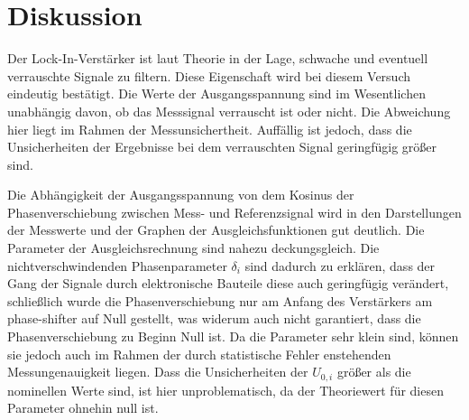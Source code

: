 \section{Diskussion}
\label{sec:Diskussion}
Der Lock-In-Verstärker ist laut Theorie in der Lage, schwache und eventuell
verrauschte Signale zu filtern. Diese Eigenschaft wird bei diesem Versuch eindeutig bestätigt.
Die Werte der Ausgangsspannung sind im Wesentlichen unabhängig davon, ob das Messsignal
verrauscht ist oder nicht. Die Abweichung hier liegt im Rahmen der Messunsichertheit.
Auffällig ist jedoch, dass die Unsicherheiten der Ergebnisse bei dem verrauschten
Signal geringfügig größer sind.

Die Abhängigkeit der Ausgangsspannung von dem Kosinus der Phasenverschiebung zwischen
Mess- und Referenzsignal wird in den Darstellungen der Messwerte und der Graphen
der Ausgleichsfunktionen gut deutlich. Die Parameter der Ausgleichsrechnung sind
nahezu deckungsgleich. Die nichtverschwindenden Phasenparameter $\delta_i$ sind
dadurch zu erklären, dass der Gang der Signale durch elektronische Bauteile diese
auch geringfügig verändert, schließlich wurde die Phasenverschiebung nur am
Anfang des Verstärkers am phase-shifter auf Null gestellt, was widerum auch nicht
garantiert, dass die Phasenverschiebung zu Beginn Null ist. Da die Parameter sehr
klein sind, können sie jedoch auch im Rahmen der  durch statistische Fehler enstehenden
Messungenauigkeit liegen.
Dass die Unsicherheiten der $U_{0,i}$ größer als die nominellen Werte sind, ist
hier unproblematisch, da der Theoriewert für diesen Parameter ohnehin null ist.
